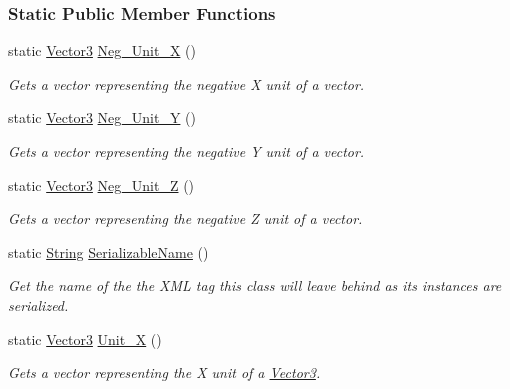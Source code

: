 \subsubsection*{Static Public Member Functions}
\begin{DoxyCompactItemize}
\item 
static \hyperlink{classMezzanine_1_1Vector3}{Vector3} \hyperlink{classMezzanine_1_1Vector3_a623e9d9270a10470adae238ff99c2047}{Neg\_\-Unit\_\-X} ()
\begin{DoxyCompactList}\small\item\em Gets a vector representing the negative X unit of a vector. \item\end{DoxyCompactList}\item 
static \hyperlink{classMezzanine_1_1Vector3}{Vector3} \hyperlink{classMezzanine_1_1Vector3_aa1d03a53c2243aea84cf36348185aa31}{Neg\_\-Unit\_\-Y} ()
\begin{DoxyCompactList}\small\item\em Gets a vector representing the negative Y unit of a vector. \item\end{DoxyCompactList}\item 
static \hyperlink{classMezzanine_1_1Vector3}{Vector3} \hyperlink{classMezzanine_1_1Vector3_a455fbf24b646a69bebaf3b7aea0bde5b}{Neg\_\-Unit\_\-Z} ()
\begin{DoxyCompactList}\small\item\em Gets a vector representing the negative Z unit of a vector. \item\end{DoxyCompactList}\item 
static \hyperlink{namespaceMezzanine_acf9fcc130e6ebf08e3d8491aebcf1c86}{String} \hyperlink{classMezzanine_1_1Vector3_a0e88d00b51bb3223b6da8bfb45c6a2d7}{SerializableName} ()
\begin{DoxyCompactList}\small\item\em Get the name of the the XML tag this class will leave behind as its instances are serialized. \item\end{DoxyCompactList}\item 
static \hyperlink{classMezzanine_1_1Vector3}{Vector3} \hyperlink{classMezzanine_1_1Vector3_aa3d186d62631a38fe6cd553a1a92469a}{Unit\_\-X} ()
\begin{DoxyCompactList}\small\item\em Gets a vector representing the X unit of a \hyperlink{classMezzanine_1_1Vector3}{Vector3}. \item\end{DoxyCompactList}\item 

\end{DoxyCompactItemize}
